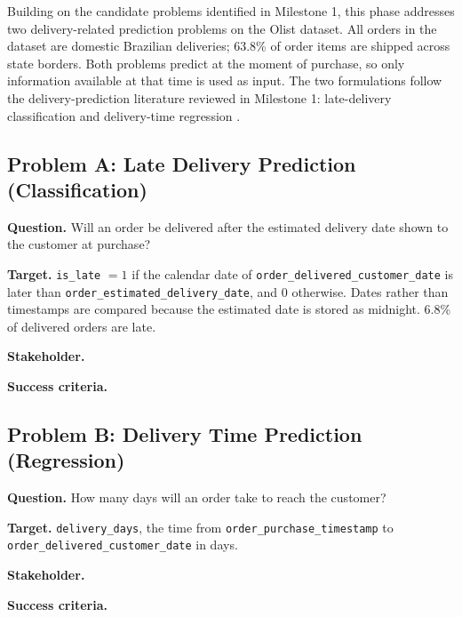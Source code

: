 
Building on the candidate problems identified in Milestone 1, this phase
addresses two delivery-related prediction problems on the Olist dataset. All
orders in the dataset are domestic Brazilian deliveries; 63.8\% of order items
are shipped across state borders. Both problems predict at the moment of
purchase, so only information available at that time is used as input. The
two formulations follow the delivery-prediction literature reviewed in
Milestone 1: late-delivery classification and delivery-time regression
\citep{steinberg2023late, salari2022delivery}.

\subsection{Problem A: Late Delivery Prediction (Classification)}

\textbf{Question.} Will an order be delivered after the estimated delivery date
shown to the customer at purchase?

\textbf{Target.} \texttt{is\_late} $= 1$ if the calendar date of
\texttt{order\_\allowbreak delivered\_\allowbreak customer\_\allowbreak date} is later than
\texttt{order\_\allowbreak estimated\_\allowbreak delivery\_\allowbreak date}, and $0$ otherwise. Dates rather than
timestamps are compared because the estimated date is stored as midnight.
6.8\% of delivered orders are late.

\textbf{Stakeholder.} 

\textbf{Success criteria.} 

\subsection{Problem B: Delivery Time Prediction (Regression)}

\textbf{Question.} How many days will an order take to reach the customer?

\textbf{Target.} \texttt{delivery\_days}, the time from
\texttt{order\_\allowbreak purchase\_\allowbreak timestamp} to \texttt{order\_\allowbreak delivered\_\allowbreak customer\_\allowbreak date}
in days.

\textbf{Stakeholder.} 

\textbf{Success criteria.} 
